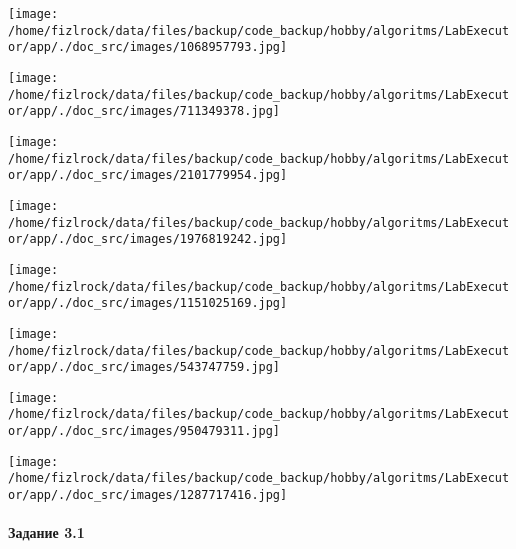 \documentclass[a4paper, 12pt]{article}
\begin{document}
\texttt{[image: /home/fizlrock/data/files/backup/code\_backup/hobby/algoritms/LabExecutor/app/./doc\_src/images/1068957793.jpg]}

\texttt{[image: /home/fizlrock/data/files/backup/code\_backup/hobby/algoritms/LabExecutor/app/./doc\_src/images/711349378.jpg]}

\texttt{[image: /home/fizlrock/data/files/backup/code\_backup/hobby/algoritms/LabExecutor/app/./doc\_src/images/2101779954.jpg]}

\texttt{[image: /home/fizlrock/data/files/backup/code\_backup/hobby/algoritms/LabExecutor/app/./doc\_src/images/1976819242.jpg]}

\texttt{[image: /home/fizlrock/data/files/backup/code\_backup/hobby/algoritms/LabExecutor/app/./doc\_src/images/1151025169.jpg]}

\texttt{[image: /home/fizlrock/data/files/backup/code\_backup/hobby/algoritms/LabExecutor/app/./doc\_src/images/543747759.jpg]}

\texttt{[image: /home/fizlrock/data/files/backup/code\_backup/hobby/algoritms/LabExecutor/app/./doc\_src/images/950479311.jpg]}

\texttt{[image: /home/fizlrock/data/files/backup/code\_backup/hobby/algoritms/LabExecutor/app/./doc\_src/images/1287717416.jpg]}
\pagebreak
\paragraph{Задание 3.1}
\end{document}
